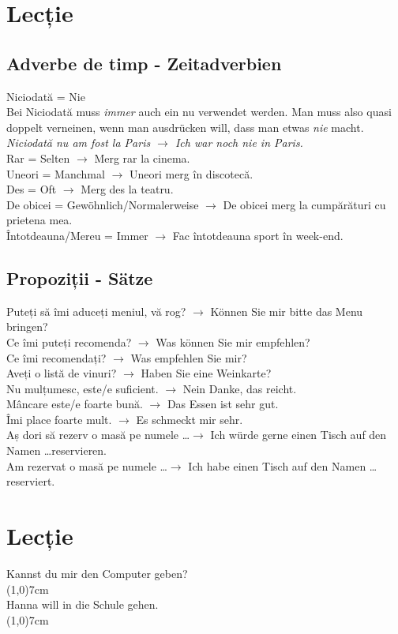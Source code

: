 \documentclass[11pt, oneside]{article}
\begin{document}
\pagebreak
\section{Lecție}
\subsection{Adverbe de timp - Zeitadverbien}
Niciodată = Nie\\
Bei Niciodată muss \emph{immer} auch ein nu verwendet werden. Man muss also quasi 
doppelt verneinen, wenn man ausdrücken will, dass man etwas \emph{nie} macht.\\
\emph{Niciodată nu am fost la Paris $\rightarrow$ Ich war noch nie in Paris.}\\
\newline
Rar = Selten $\rightarrow$ Merg rar la cinema.\\
Uneori = Manchmal $\rightarrow$ Uneori merg în discotecă.\\
Des = Oft $\rightarrow$ Merg des la teatru.\\
De obicei = Gewöhnlich/Normalerweise $\rightarrow$ De obicei merg la cumpărături cu prietena mea.\\
Întotdeauna/Mereu = Immer $\rightarrow$ Fac întotdeauna sport în week-end.
\subsection{Propoziții - Sätze}
Puteți să îmi aduceți meniul, vă rog? $\rightarrow$ Können Sie mir bitte das Menu bringen?\\
Ce îmi puteți recomenda? $\rightarrow$ Was können Sie mir empfehlen?\\
Ce îmi recomendați? $\rightarrow$ Was empfehlen Sie mir?\\
Aveți o listă de vinuri? $\rightarrow$ Haben Sie eine Weinkarte?\\
Nu mulțumesc, este/e suficient. $\rightarrow$ Nein Danke, das reicht.\\
Mâncare este/e foarte bună. $\rightarrow$ Das Essen ist sehr gut.\\
Îmi place foarte mult. $\rightarrow$ Es schmeckt mir sehr.\\
Aș dori să rezerv o masă pe numele \dots $\rightarrow$ Ich würde gerne einen Tisch auf den Namen \dots reservieren.\\
Am rezervat o masă pe numele \dots $\rightarrow$ Ich habe einen Tisch auf den Namen \dots reserviert.
\pagebreak
\section{Lecție}
\onehalfspacing
Kannst du mir den Computer geben?\\
\line(1,0){7cm}\\
%
Hanna will in die Schule gehen.\\
\line(1,0){7cm}\\
\end{document}

